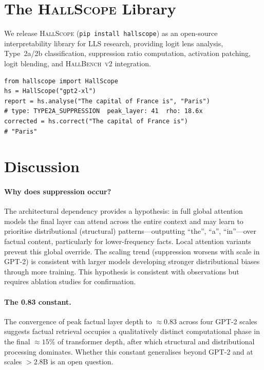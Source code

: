 \documentclass{article}
\begin{document}
\section{The \textsc{HallScope} Library}

We release \textsc{HallScope} (\texttt{pip install hallscope}) as an
open-source interpretability library for LLS research, providing logit lens
analysis, Type~2a/2b classification, suppression ratio computation, activation
patching, logit blending, and \textsc{HallBench~v2} integration.

\begin{verbatim}
from hallscope import HallScope
hs = HallScope("gpt2-xl")
report = hs.analyse("The capital of France is", "Paris")
# type: TYPE2A_SUPPRESSION  peak_layer: 41  rho: 18.6x
corrected = hs.correct("The capital of France is")
# "Paris"
\end{verbatim}

\section{Discussion}

\paragraph{Why does suppression occur?}
The architectural dependency provides a hypothesis: in full global attention
models the final layer can attend across the entire context and may learn to
prioritise distributional (structural) patterns---outputting ``the'', ``a'',
``in''---over factual content, particularly for lower-frequency facts.
Local attention variants prevent this global override.
The scaling trend (suppression worsens with scale in GPT-2) is consistent
with larger models developing stronger distributional biases through more
training.
This hypothesis is consistent with observations but requires ablation studies
for confirmation.

\paragraph{The 0.83 constant.}
The convergence of peak factual layer depth to $\approx 0.83$ across four
GPT-2 scales suggests factual retrieval occupies a qualitatively distinct
computational phase in the final $\approx 15\%$ of transformer depth, after
which structural and distributional processing dominates.
Whether this constant generalises beyond GPT-2 and at scales $>2.8$B is an
open question.
\end{document}
